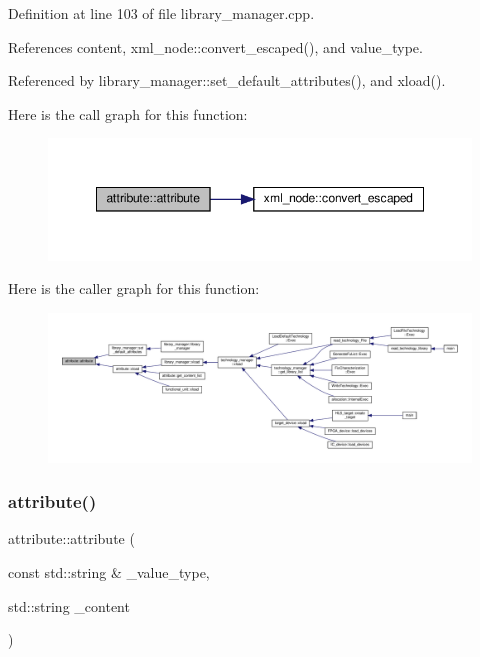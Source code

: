 Definition at line 103 of file library\+\_\+manager.\+cpp.



References content, xml\+\_\+node\+::convert\+\_\+escaped(), and value\+\_\+type.



Referenced by library\+\_\+manager\+::set\+\_\+default\+\_\+attributes(), and xload().

Here is the call graph for this function\+:
\nopagebreak
\begin{figure}[H]
\begin{center}
\leavevmode
\includegraphics[width=348pt]{d9/d18/structattribute_a918c83ed0432675e9679f57c1233147e_cgraph}
\end{center}
\end{figure}
Here is the caller graph for this function\+:
\nopagebreak
\begin{figure}[H]
\begin{center}
\leavevmode
\includegraphics[width=350pt]{d9/d18/structattribute_a918c83ed0432675e9679f57c1233147e_icgraph}
\end{center}
\end{figure}
\mbox{\label{structattribute_a6bb99da6a48c7255b6259a112a998a1e}} 
\subsubsection{\texorpdfstring{attribute()}{attribute()}\hspace{0.1cm}{\footnotesize\ttfamily [2/3]}}
{\footnotesize\ttfamily attribute\+::attribute (\begin{DoxyParamCaption}\item[{const std\+::string \&}]{\+\_\+value\+\_\+type,  }\item[{std\+::string}]{\+\_\+content }\end{DoxyParamCaption})}



